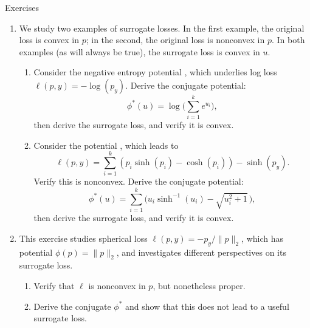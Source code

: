 \begin{xcb}{Exercises}
\begin{enumerate}[label=\thechapter.\arabic*]
\begin{enumerate}[label=\alph*.]
\item Give an example of a strictly proper loss which does not admit a
  differentiable potential. Hint: based on the last part, we know that such an
  example loss cannot be continuous in the first argument, for all values of the
  second.   
\end{enumerate}

\item \label{ex:proper_loss_surrogate}
  We study two examples of surrogate losses. In the first example, the original
  loss is convex in $p$; in the second, the original loss is nonconvex in
  $p$. In both examples (as will always be true), the surrogate loss is
  convex in $u$.

\begin{enumerate}[label=\alph*.]
\item Consider the negative entropy potential , which underlies log loss $\ell(p,y) = -\log(p_y)$. Derive the
  conjugate potential: 
  \[
  \phi^*(u) = \log\bigg( \sum_{i=1}^k e^{u_i} \bigg),
  \]
  then derive the surrogate loss, and verify it is convex.

\item Consider the potential , which
  leads to
  \[
  \ell(p,y) = \sum_{i=1}^k (p_i \sinh(p_i) - \cosh(p_i)) - \sinh(p_y).
  \]
  Verify this is nonconvex. Derive the conjugate potential:
  \[
  \phi^*(u) = \sum_{i=1}^k \Big( u_i \sinh^{-1}(u_i) - \sqrt{u_i^2+1} \, \Big),
  \]
  then derive the surrogate loss, and verify it is convex.
\end{enumerate}

\item \label{ex:spherical_loss}
  This exercise studies spherical loss $\ell(p,y) = -p_y / \|p\|_2$, which has 
  potential $\phi(p) = \|p\|_2$, and investigates different perspectives on its
  surrogate loss.    

\begin{enumerate}[label=\alph*.]
\item Verify that $\ell$ is nonconvex in $p$, but nonetheless proper.

\item Derive the conjugate $\phi^*$ and show that this does not lead to a useful
  surrogate loss. 


\end{enumerate}
\end{enumerate}
\end{xcb}
